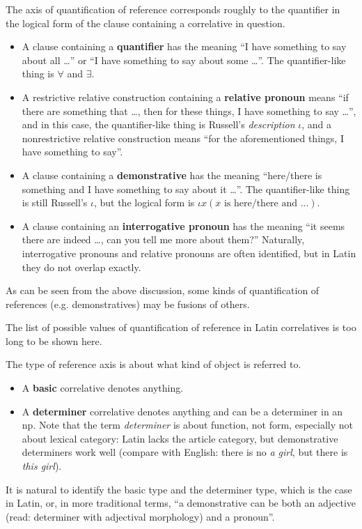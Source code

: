 \documentclass{article}
\newcommand*{\concept}[1]{\textbf{#1}}
\newcommand*{\term}[1]{\emph{#1}}
\newcommand*{\corpus}[1]{\emph{#1}}
\begin{document}
\begin{itemize}
    The axis of quantification of reference corresponds roughly to 
    the quantifier in the logical form of the clause containing a correlative in question.
    \begin{itemize}
        \item A clause containing a \concept{quantifier} has the meaning 
        ``I have something to say about all \dots'' or ``I have something to say about some \dots''.
        The quantifier-like thing is $\forall$ and $\exists$.
        \item A restrictive relative construction containing a \concept{relative pronoun} means 
        ``if there are something that \dots, then for these things, I have something to say \dots'',
        and in this case, the quantifier-like thing is Russell's \emph{description} $\iota$,
        and a nonrestrictive relative construction means 
        ``for the aforementioned things, I have something to say''.
        \item A clause containing a \concept{demonstrative} has the meaning 
        ``here/there is something and I have something to say about it \dots''.
        The quantifier-like thing is still Russell's $\iota$,
        but the logical form is 
        $\iota x (\text{$x$ is here/there and ...})$.
        \item A clause containing an \concept{interrogative pronoun} has the meaning 
        ``it seems there are indeed \dots, can you tell me more about them?''
        Naturally, interrogative pronouns and relative pronouns are often identified,
        but in Latin they do not overlap exactly.
    \end{itemize}
    As can be seen from the above discussion, 
    some kinds of quantification of references (e.g. demonstratives) may be fusions of others.

    The list of possible values of quantification of reference in Latin correlatives is too long to be shown here. %
    
    The type of reference axis is about what kind of object is referred to.
    \begin{itemize}
        \item A \concept{basic} correlative denotes anything. 
        \item A \concept{determiner} correlative denotes anything and can be a determiner in an \ac{np}.
        Note that the term \term{determiner} is about function, not form, especially not about lexical category:
        Latin lacks the article category, but demonstrative determiners work well
        (compare with English: there is no \corpus{a girl}, but there is \corpus{this girl}).
    \end{itemize} 
    It is natural to identify the basic type and the determiner type, which is the case in Latin,
    or, in more traditional terms, ``a demonstrative can be both an adjective 
    (read: determiner with adjectival morphology) and a pronoun''.


\end{itemize}
\end{document}
